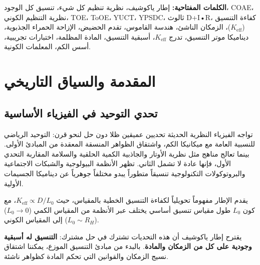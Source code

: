 \documentclass[11pt,a4paper]{article}
\begin{document}
\begin{abstract}
		\vspace{0.5em}
		\noindent \textbf{الاكتشاف الأساسي:} 
		نحدد العمود الفقري البديهي للنظرية كحلقة جبرية مغلقة من الثوابت الأساسية ($S_{\mathrm{odd}} = 6/5$، $S_{\mathrm{even}} = 4/5$)، والتي تحدد بشكل صارم الأس العام $\beta = 2/3$. نبرهن أن هذه الحلقة تشكل نظاماً منطقياً مكتفياً ذاتياً وخالياً من المعاملات. يتم التحقق من اتساقها الداخلي بقوة من خلال تطابق هندسي دقيق ناشئ: $S_{\mathrm{odd}}\varphi^2 \approx \pi$ (خطأ $10^{-5}$)، الذي يربط الطيف المتقطع لكتل الفرميونات مباشرة بهندسة الزمكان المتصلة. هذا يؤسس YUCT ليس كملاءمة ظاهرية، بل كإطار بديهي موحد وقابل للدحض لديناميكا تنسيق الواقع.
	\end{abstract}
	
	\noindent\textbf{الكلمات المفتاحية:} إطار ياكوشيف، نظرية تنظيم كل شيء، تنسيق كل الوجود، COAE، نظرية التنظيم الكوني، TOE، ToOE، YUCT، YPSDC، ثالوث D+I•R، كفاءة التنسيق ($K_{\mathrm{eff}}$)، الزمكان الناشئ، هندسة القاموس، تقدم الحضيض، الإزاحة الحمراء الجذبوية، ديناميكا موتر التنسيق، تدرج $K_{\mathrm{eff}}$، أسبقية التنسيق، المادة المظلمة، اختبارات تجريبية، أسس الكم، المعلمات الكونية.
	
	\newpage
	
	\section{المقدمة والسياق التاريخي}
	\subsection{تحدي التوحيد في الفيزياء الأساسية}
	تواجه الفيزياء النظرية الحديثة تحديين عميقين ظلا دون حل لنحو قرن: التوحيد الرياضي للنسبية العامة مع ميكانيكا الكم، واشتقاق الظواهر المنسقة المعقدة من المبادئ الأولى. بينما تعالج مناهج مثل نظرية الأوتار والجاذبية الكمية الحلقية والسلامة المقاربة التحدي الأول، فإنها عادة لا تشمل الثاني. تظهر الأنظمة البيولوجية والشبكات الاجتماعية والبروتوكولات التكنولوجية تنسيقاً متطوراً يبدو مختلفاً جوهرياً عن ديناميكا الجسيمات الأولية.
	
	يقدم الإطار مفهوماً تحويلياً لكفاءة التنسيق الخطية بالمقياس، حيث $K_{\mathrm{eff}} \propto D/L_0$، مع كون $L_0$ طول مقياس تنسيق أساسي يختلف عبر الأنظمة من المقياس الكمي ($L_0 \to 0$) إلى المقياس الكوني ($L_0 \sim R_H$).
	
	يقترح إطار ياكوشيف أن هذه التحديات تشترك في حل مشترك: \textbf{التنسيق له أسبقية وجودية على كل من الزمكان والمادة}. بالبدء من مبادئ التنسيق الموزع، يمكننا اشتقاق نسيج الزمكان والقوانين التي تحكم المادة كظواهر ناشئة.
	
\end{document}
